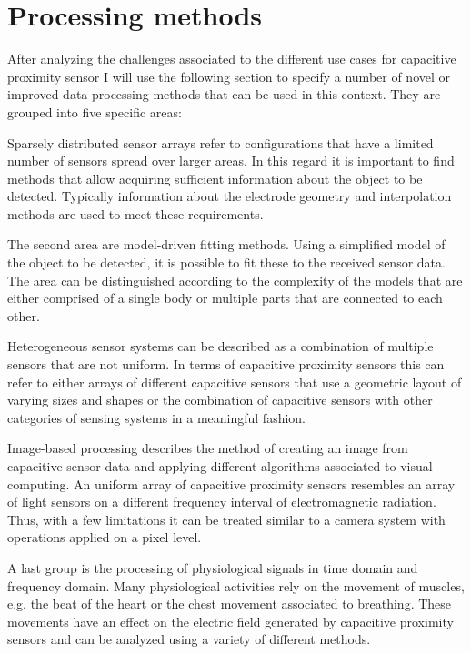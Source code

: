 \section{Processing methods}
\label{ch:prot_proc}
After analyzing the challenges associated to the different use cases for capacitive proximity sensor I will use the following section to specify a number of novel or improved data processing methods that can be used in this context. They are grouped into five specific areas:

Sparsely distributed sensor arrays refer to configurations that have a limited number of sensors spread over larger areas. In this regard it is important to find methods that allow acquiring sufficient information about the object to be detected. Typically information about the electrode geometry and interpolation methods are used to meet these requirements.

The second area are model-driven fitting methods. Using a simplified model of the object to be detected, it is possible to fit these to the received sensor data. The area can be distinguished according to the complexity of the models that are either comprised of a single body or multiple parts that are connected to each other.

Heterogeneous sensor systems can be described as a combination of multiple sensors that are not uniform. In terms of capacitive proximity sensors this can refer to either arrays of different capacitive sensors that use a geometric layout of varying sizes and shapes or the combination of capacitive sensors with other categories of sensing systems in a meaningful fashion.

Image-based processing describes the method of creating an image from capacitive sensor data and applying different algorithms associated to visual computing. An uniform array of capacitive proximity sensors resembles an array of light sensors on a different frequency interval of electromagnetic radiation. Thus, with a few limitations it can be treated similar to a camera system with operations applied on a pixel level.

A last group is the processing of physiological signals in time domain and frequency domain. Many physiological activities rely on the movement of muscles, e.g. the beat of the heart or the chest movement associated to breathing. These movements have an effect on the electric field generated by capacitive proximity sensors and can be analyzed using a variety of different methods.







